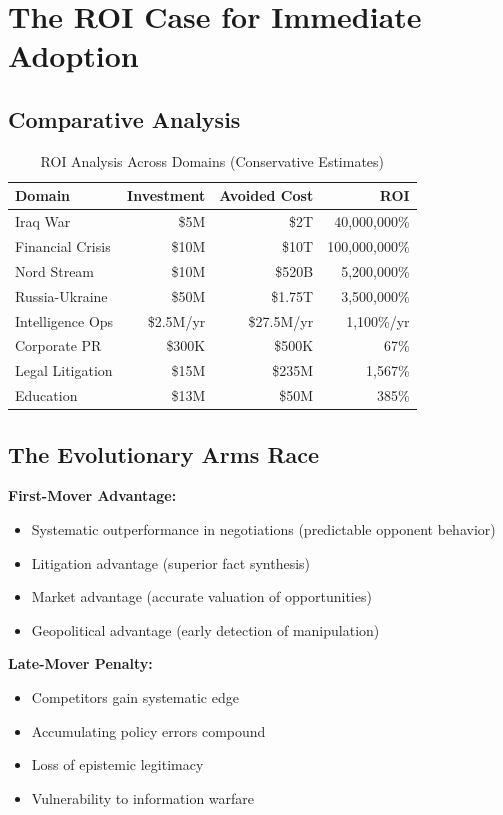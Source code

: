 \documentclass[11pt,a4paper]{article}
\theoremstyle{definition}
\theoremstyle{remark}
\begin{document}
\section{The ROI Case for Immediate Adoption}

\subsection{Comparative Analysis}

\begin{table}[h]
\centering
\small
\begin{tabular}{|l|r|r|r|}
\hline
\textbf{Domain} & \textbf{Investment} & \textbf{Avoided Cost} & \textbf{ROI} \\
\hline
Iraq War & \$5M & \$2T & 40,000,000\% \\
Financial Crisis & \$10M & \$10T & 100,000,000\% \\
Nord Stream & \$10M & \$520B & 5,200,000\% \\
Russia-Ukraine & \$50M & \$1.75T & 3,500,000\% \\
Intelligence Ops & \$2.5M/yr & \$27.5M/yr & 1,100\%/yr \\
Corporate PR & \$300K & \$500K & 67\% \\
Legal Litigation & \$15M & \$235M & 1,567\% \\
Education & \$13M & \$50M & 385\% \\
\hline
\end{tabular}
\caption{ROI Analysis Across Domains (Conservative Estimates)}
\end{table}

\subsection{The Evolutionary Arms Race}

\textbf{First-Mover Advantage:}
\begin{itemize}
\item Systematic outperformance in negotiations (predictable opponent behavior)
\item Litigation advantage (superior fact synthesis)
\item Market advantage (accurate valuation of opportunities)
\item Geopolitical advantage (early detection of manipulation)
\end{itemize}

\textbf{Late-Mover Penalty:}
\begin{itemize}
\item Competitors gain systematic edge
\item Accumulating policy errors compound
\item Loss of epistemic legitimacy
\item Vulnerability to information warfare
\end{itemize}
\end{document}
